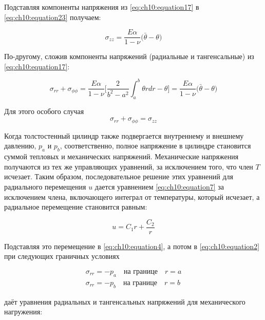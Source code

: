 Подставляя компоненты напряжения из \cref{eq:ch10:equation17} в \cref{eq:ch10:equation23} получаем:

\begin{equation}
	\label{eq:ch10:equation25}
	\sigma_{zz} = \frac{E \alpha}{1 - \nu} \big ( \bar{\theta} - \theta \big )
\end{equation}

По-другому, сложив компоненты напряжений (радиальные и тангенсальные) из \cref{eq:ch10:equation17}:

\begin{equation}
	\label{eq:ch10:equation26}
	\sigma_{rr} + \sigma_{\phi\phi} = \frac{E \alpha}{1-\nu} \big [\frac{2}{b^2 - a^2} \int_a^b \theta rdr - \theta \big] = \frac{E \alpha}{1 - \nu} \big ( \bar{\theta} - \theta \big )
\end{equation}

Для этого особого случая
\begin{equation}
	\label{eq:ch10:equation27}
	\sigma_{rr} + \sigma_{\phi\phi} = \sigma_{zz}
\end{equation}

Когда толстостенный цилиндр также подвергается внутреннему и внешнему давлению, \(p_a\) и \(p_b\), соответственно, полное напряжение в цилиндре становится суммой тепловых и механических напряжений. Механические напряжения получаются из тех же управляющих уравнений, за исключением того, что член \(T\) исчезает. Таким образом, последовательное решение этих уравнений для радиального перемещения \(u\) дается уравнением \cref{eq:ch10:equation7} за исключением члена, включающего интеграл от
температуры, который исчезает, а радиальное перемещение становится равным:

\begin{equation}
	\label{eq:ch10:equation28}
	u = C_1 r + \frac{C_2}{r}
\end{equation}

Подставляя это перемещение в \cref{eq:ch10:equation4}, а потом в \cref{eq:ch10:equation2} при следующих граничных условиях

\begin{equation}
	\label{eq:ch10:equation29}
	\begin{split}
		\sigma_{rr} = -p_a \quad \text{на границе} \quad r=a \\
		\sigma_{rr} = -p_b \quad \text{на границе} \quad r=b
	\end{split}
\end{equation}

даёт уравнения радиальных и тангенсальных напряжений для механического нагружения:

